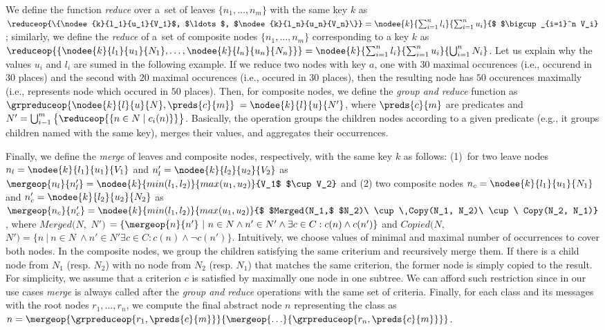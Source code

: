 {We define the function \emph{reduce} over a~set of leaves $\{n_1,\ldots,n_m\}$
with the same key $k$ as $\reduceop{\{\nodee{k}{l_1}{u_1}{V_1}$, $\ldots$,
$\nodee{k}{l_n}{u_n}{V_n}\}} = \nodee{k}{\sum_{i=1}^n l_i}{\sum_{i=1}^n u_i}{$
$\bigcup_{i=1}^n V_i}$; similarly,  we define the \emph{reduce} of a~set of
composite nodes $\{n_1,\ldots,n_m\}$ corresponding to a key $k$ as
$\reduceop{\{ \nodee{k}{l_1}{u_1}{N_1}, \ldots, \nodee{k}{l_n}{u_n}{N_n}\}} =
\nodee{k}{\sum_{i=1}^n l_i}{\sum_{i=1}^n u_i}{\bigcup_{i=1}^n N_i}$.  
%
Let us explain why the values $u_i$ and $l_i$ are sumed in the following example.
If we reduce two nodes with key $a$, one with $30$ maximal occurences (i.e., occurend in $30$ places)
and the second with $20$ maximal occurences (i.e., occured in $30$ places),
then the resulting node has $50$ occurences maximally (i.e., represents node which occured in $50$ places).
%
Then, for composite nodes, we define the \emph{group and reduce} function as
$\grpreduceop{\nodee{k}{l}{u}{N},\preds{c}{m}}$ $= \nodee{k}{l}{u}{N'}$, where
$\preds{c}{m}$ are predicates and $N' = \bigcup_{i-1}^m \big\{ \reduceop{\{n \in N \mid
c_i(n)\}}\big\}$.
%
Basically, the operation groups the children nodes according to a given
predicate (e.g., it groups children named with the same key), merges their
values, and aggregates their occurrences.

Finally, we define the \emph{merge} of leaves and composite nodes, respectively, with the
same key $k$ as follows: (1)~for two leave nodes $n_l=\nodee{k}{l_1}{u_1}{V_1}$ and
$n_l'=\nodee{k}{l_2}{u_2}{V_2}$ as $\mergeop{n_l}{n_l'} = \nodee{k}{min(l_1,
l_2)}{max(u_1, u_2)}{V_1$ $\cup V_2}$ and (2) two composite nodes
$n_c=\nodee{k}{l_1}{u_1}{N_1}$ and $n_c'=\nodee{k} {l_2}{u_2}{N_2}$ as $\mergeop{n_c}{n_c'} =
\nodee{k}{min(l_1, l_2)}{max(u_1, u_2)}{$ $Merged(N_1,$ $N_2)\ \cup\ Copy(N_1,
N_2)\ \cup\ Copy(N_2, N_1)}$, where $Merged(N,$ $N')$ $= \{\mergeop{n}{n'}\ |\ 
n \in N \wedge n' \in N' \wedge \exists c \in C: c(n) \wedge c(n')\}$
and $Copied(N,$ $N') = \{n\ |\ n \in N \ \wedge n' \in N' \exists c\in C: c(n) \wedge \neg c(n')\}$.
%
Intuitively, we choose values of minimal and maximal number of occurrences to cover both
nodes.
%
In the composite nodes, we group the children satisfying the same criterium and
recursively merge them.  If there is a child node from $N_1$ (resp. $N_2$) with
no node from $N_2$ (resp. $N_1$) that matches the same criterion, the former node
is simply copied to the result.  For simplicity, we assume that a criterion $c$
is satisfied by maximally one node in one subtree. 
We can afford such restriction since in our use cases \emph{merge} is always
called after the \emph{group and reduce} operations with the same set of criteria. 
%
Finally, for each class and its messages with the root nodes $r_1, \ldots,
r_n$, we compute the final abstract node $n$ representing the class as $n =
\mergeop{\grpreduceop{r_1,\preds{c}{m}}}{\mergeop{\ldots}{\grpreduceop{r_n,\preds{c}{m}}}}$.

}

